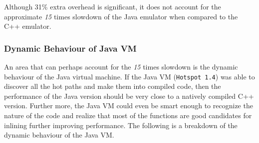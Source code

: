 Although 31\% extra overhead is significant, it does not account for the
approximate \emph{15} times slowdown of the Java emulator when compared to
the C++ emulator.


\subsubsection*{Dynamic Behaviour of Java VM}

An area that can perhaps account for the \emph{15} times slowdown is the
dynamic behaviour of the Java virtual machine. If the Java VM
(\texttt{Hotspot 1.4}) was able to discover all the hot paths and make
them into compiled code, then the performance of the Java version should
be very close to a natively compiled C++ version. Further more, the Java
VM could even be smart enough to recognize the nature of the code and
realize that most of the functions are good candidates for inlining
further improving performance. The following is a breakdown of the dynamic
behaviour of the Java VM.

